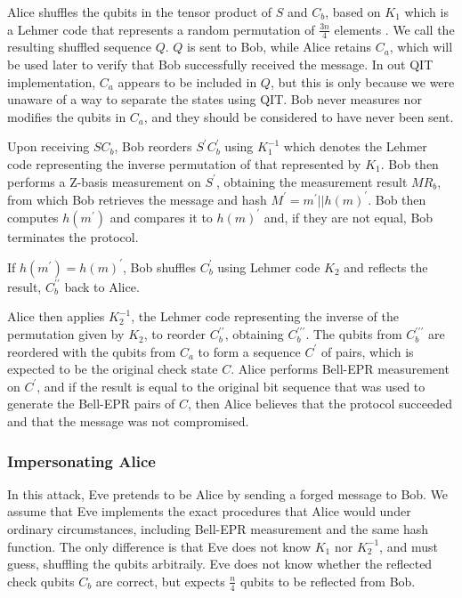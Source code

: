 \documentclass[conference,compsoc]{IEEEtran}
\begin{document}
Alice shuffles the qubits in the tensor product of $S$ and $C_{b}$,
based on $K_{1}$ which is a Lehmer code that represents a random permutation of $\frac{3n}{4}$ elements \cite{Rauschmayer}.
We call the resulting shuffled sequence $Q$. $Q$ is sent to Bob, while Alice retains $C_{a}$,
which will be used later to verify that Bob successfully received the message. In out QIT implementation,
$C_{a}$ appears to be included in $Q$, but this is only because we were unaware of a way to separate the states
using QIT. Bob never measures nor modifies the qubits in $C_{a}$, and they should be considered to have never been sent.

Upon receiving $SC_{b}$, Bob reorders $S^{\prime}C_{b}^{\prime}$
using $K_{1}^{-1}$ which denotes the Lehmer code representing the inverse permutation of that represented by $K_{1}$.
Bob then performs a Z-basis measurement on $S^{\prime}$,
obtaining the measurement result $MR_{b}$, from which Bob retrieves
the message and hash $M^{\prime}=m^{\prime}||h\left(m\right)^{\prime}$.
Bob then computes $h\left(m^{\prime}\right)$ and compares it to $h\left(m\right)^{\prime}$
and, if they are not equal, Bob terminates the protocol.

If $h\left(m^{\prime}\right)=h\left(m\right)^{\prime}$, Bob shuffles
$C_{b}^{\prime}$ using Lehmer code $K_{2}$ and reflects the result, $C_{b}^{\prime\prime}$
back to Alice.

Alice then applies $K_{2}^{-1}$, the Lehmer code representing the inverse
of the permutation given by $K_{2}$, to reorder $C_{b}^{\prime\prime}$, obtaining
$C_{b}^{\prime\prime\prime}$. The qubits from $C_{b}^{\prime\prime\prime}$ are reordered
with the qubits from $C_{a}$ to form a sequence $C^{\prime}$ of pairs, which is expected to be the
original check state $C$. Alice performs Bell-EPR measurement on $C^{\prime}$, and if the result
is equal to the original bit sequence that was used to generate the Bell-EPR pairs of $C$,
then Alice believes that the protocol succeeded and that the message was not compromised.

\subsubsection{Impersonating Alice}

In this attack, Eve pretends to be Alice by sending a forged message to Bob.
We assume that Eve implements the exact procedures that Alice
would under ordinary circumstances, including Bell-EPR
measurement and the same hash function. The only difference is that Eve
does not know $K_{1}$ nor $K_{2}^{-1}$, and must guess, shuffling the
qubits arbitraily. Eve does not know whether the reflected check qubits $C_{b}$
are correct, but expects $\frac{n}{4}$ qubits to be reflected from Bob.
\end{document}
